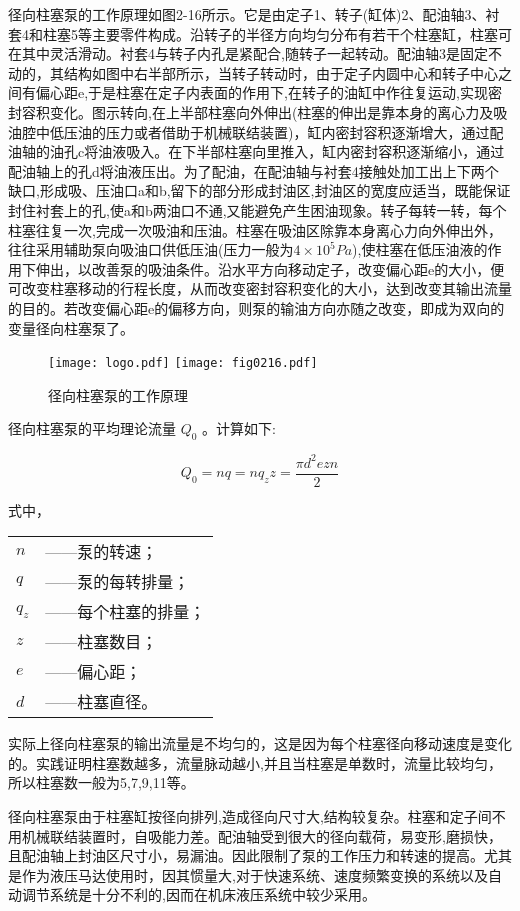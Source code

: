 径向柱塞泵的工作原理如图2-16所示。它是由定子1、转子(缸体)2、配油轴3、衬套4和柱塞5等主要零件构成。沿转子的半径方向均匀分布有若干个柱塞缸，柱塞可在其中灵活滑动。衬套4与转子内孔是紧配合,随转子一起转动。配油轴3是固定不动的，其结构如图中右半部所示，当转子转动时，由于定子内圆中心和转子中心之间有偏心距e,于是柱塞在定子内表面的作用下,在转子的油缸中作往复运动,实现密封容积变化。图示转向,在上半部柱塞向外伸出(柱塞的伸出是靠本身的离心力及吸油腔中低压油的压力或者借助于机械联结装置)，缸内密封容积逐渐增大，通过配油轴的油孔c将油液吸入。在下半部柱塞向里推入，缸内密封容积逐渐缩小，通过配油轴上的孔d将油液压出。为了配油，在配油轴与衬套4接触处加工出上下两个缺口,形成吸、压油口a和b,留下的部分形成封油区,封油区的宽度应适当，既能保证封住衬套上的孔,使a和b两油口不通,又能避免产生困油现象。转子每转一转，每个柱塞往复一次,完成一次吸油和压油。柱塞在吸油区除靠本身离心力向外伸出外，往往采用辅助泵向吸油口供低压油(压力一般为$4\times 10^{5} Pa$),使柱塞在低压油液的作用下伸出，以改善泵的吸油条件。沿水平方向移动定子，改变偏心距e的大小，便可改变柱塞移动的行程长度，从而改变密封容积变化的大小，达到改变其输出流量的目的。若改变偏心距e的偏移方向，则泵的输油方向亦随之改变，即成为双向的变量径向柱塞泵了。

\begin{figure}[!hbt]
\centering
\ifOpenSource
\texttt{[image: logo.pdf]}
\else
\texttt{[image: fig0216.pdf]}
\fi
\caption{径向柱塞泵的工作原理}
\label{fig:fig0216}
\end{figure}

径向柱塞泵的平均理论流量 $Q_{0}$ 。计算如下:

\begin{equation}
Q_{0}=nq=nq_{z}z=\frac{\pi d^{2}ezn}{2}
\end{equation}

\noindent 式中，
\begin{tabular}[t]{ll}
 $n$ & ——泵的转速；\\ 
 $q$ & ——泵的每转排量； \\
 $q_{z}$ & ——每个柱塞的排量； \\
 $z$ & ——柱塞数目； \\
 $e$ & ——偏心距； \\
 $d$ & ——柱塞直径。
\end{tabular}

实际上径向柱塞泵的输出流量是不均匀的，这是因为每个柱塞径向移动速度是变化的。实践证明柱塞数越多，流量脉动越小,并且当柱塞是单数时，流量比较均匀，所以柱塞数一般为5,7,9,11等。

径向柱塞泵由于柱塞缸按径向排列,造成径向尺寸大,结构较复杂。柱塞和定子间不用机械联结装置时，自吸能力差。配油轴受到很大的径向载荷，易变形,磨损快，且配油轴上封油区尺寸小，易漏油。因此限制了泵的工作压力和转速的提高。尤其是作为液压马达使用时，因其惯量大,对于快速系统、速度频繁变换的系统以及自动调节系统是十分不利的,因而在机床液压系统中较少采用。

